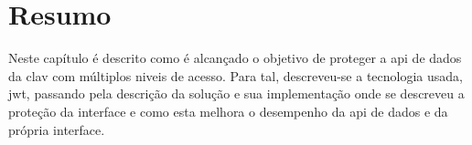 \section{Resumo}

Neste capítulo é descrito como é alcançado o objetivo de proteger a \acrshort{api} de dados da \acrshort{clav} com múltiplos niveis de acesso.
Para tal, descreveu-se a tecnologia usada, \acrshort{jwt}, passando pela descrição da solução e sua implementação onde se descreveu a proteção da interface e como esta melhora o desempenho da \acrshort{api} de dados e da própria interface.
